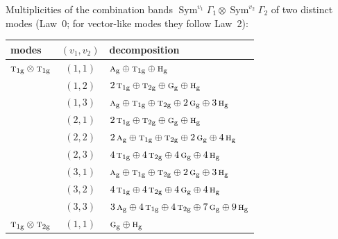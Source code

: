 \documentclass[11pt]{article}
\newcommand{\irr}[1]{\text{\normalfont\scshape #1}}
\newcommand{\ptag}[1]{\mathrm{#1}}
\begin{document}
Multiplicities of the combination bands $\operatorname{Sym}^{v_1}\Gamma_1\otimes\operatorname{Sym}^{v_2}\Gamma_2$ of two distinct modes (Law~0; for vector-like modes they follow Law~2):

\begin{longtable}{p{} c p{}}\hline modes & $(v_1,v_2)$ & decomposition\\ \hline\endhead

$\irr{t}_{1\ptag{g}}\otimes \irr{t}_{1\ptag{g}}$ & $(1,1)$ & $\irr{a}_{\ptag{g}}\oplus \irr{t}_{1\ptag{g}}\oplus \irr{h}_{\ptag{g}}$\\

 & $(1,2)$ & $2\,\irr{t}_{1\ptag{g}}\oplus \irr{t}_{2\ptag{g}}\oplus \irr{g}_{\ptag{g}}\oplus \irr{h}_{\ptag{g}}$\\

 & $(1,3)$ & $\irr{a}_{\ptag{g}}\oplus \irr{t}_{1\ptag{g}}\oplus \irr{t}_{2\ptag{g}}\oplus 2\,\irr{g}_{\ptag{g}}\oplus 3\,\irr{h}_{\ptag{g}}$\\

 & $(2,1)$ & $2\,\irr{t}_{1\ptag{g}}\oplus \irr{t}_{2\ptag{g}}\oplus \irr{g}_{\ptag{g}}\oplus \irr{h}_{\ptag{g}}$\\

 & $(2,2)$ & $2\,\irr{a}_{\ptag{g}}\oplus \irr{t}_{1\ptag{g}}\oplus \irr{t}_{2\ptag{g}}\oplus 2\,\irr{g}_{\ptag{g}}\oplus 4\,\irr{h}_{\ptag{g}}$\\

 & $(2,3)$ & $4\,\irr{t}_{1\ptag{g}}\oplus 4\,\irr{t}_{2\ptag{g}}\oplus 4\,\irr{g}_{\ptag{g}}\oplus 4\,\irr{h}_{\ptag{g}}$\\

 & $(3,1)$ & $\irr{a}_{\ptag{g}}\oplus \irr{t}_{1\ptag{g}}\oplus \irr{t}_{2\ptag{g}}\oplus 2\,\irr{g}_{\ptag{g}}\oplus 3\,\irr{h}_{\ptag{g}}$\\

 & $(3,2)$ & $4\,\irr{t}_{1\ptag{g}}\oplus 4\,\irr{t}_{2\ptag{g}}\oplus 4\,\irr{g}_{\ptag{g}}\oplus 4\,\irr{h}_{\ptag{g}}$\\

 & $(3,3)$ & $3\,\irr{a}_{\ptag{g}}\oplus 4\,\irr{t}_{1\ptag{g}}\oplus 4\,\irr{t}_{2\ptag{g}}\oplus 7\,\irr{g}_{\ptag{g}}\oplus 9\,\irr{h}_{\ptag{g}}$\\

\hline

$\irr{t}_{1\ptag{g}}\otimes \irr{t}_{2\ptag{g}}$ & $(1,1)$ & $\irr{g}_{\ptag{g}}\oplus \irr{h}_{\ptag{g}}$\\


\end{longtable}
\end{document}
